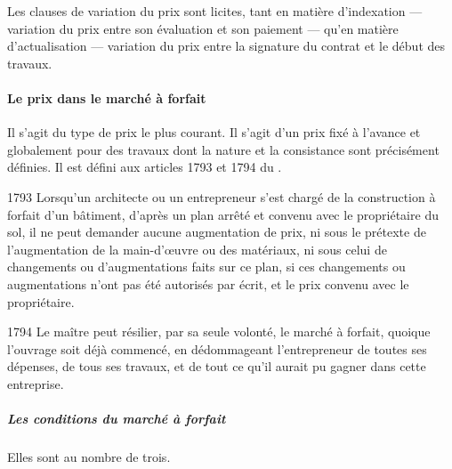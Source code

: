 				Les clauses de variation du prix sont licites, tant en matière d'indexation --- variation du prix entre son évaluation et son paiement --- qu'en matière d'actualisation --- variation du prix entre la signature du contrat et le début des travaux.
				
				\paragraph{Le prix dans le marché à forfait\\}
				
					Il s'agit du type de prix le plus courant. Il s'agit d'un prix fixé à l'avance et globalement pour des travaux dont la nature et la consistance sont précisément définies. Il est défini aux articles 1793 et 1794 du \cciv.
					
					\begin{citationArticleCciv}{1793}
						Lorsqu'un architecte ou un entrepreneur s'est chargé de la construction à forfait d'un bâtiment, d'après un plan arrêté et convenu avec le propriétaire du sol, il ne peut demander aucune augmentation de prix, ni sous le prétexte de l'augmentation de la main-d'œuvre ou des matériaux, ni sous celui de changements ou d'augmentations faits sur ce plan, si ces changements ou augmentations n'ont pas été autorisés par écrit, et le prix convenu avec le propriétaire.
					\end{citationArticleCciv}
				
					\begin{citationArticleCciv}{1794}
						Le maître peut résilier, par sa seule volonté, le marché à forfait, quoique l'ouvrage soit déjà commencé, en dédommageant l'entrepreneur de toutes ses dépenses, de tous ses travaux, et de tout ce qu'il aurait pu gagner dans cette entreprise.
					\end{citationArticleCciv}
				
					\subparagraph{Les conditions du marché à forfait\\}
					
					Elles sont au nombre de trois.
					
